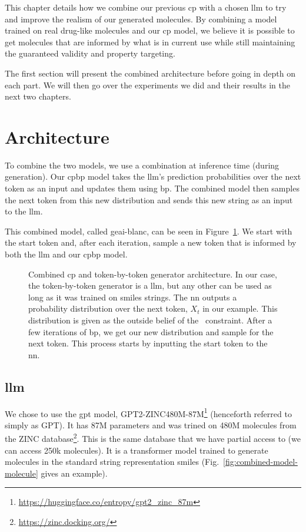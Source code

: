 \documentclass[../Document.tex]{subfiles}
\begin{document}
\label{chap:gpt+cp}
This chapter details how we combine our previous \gls{cp} with a chosen \gls{llm} to try and improve the realism of our generated molecules. By combining a model trained on real drug-like molecules and our \gls{cp} model, we believe it is possible to get molecules that are informed by what is in current use while still maintaining the guaranteed validity and property targeting.

The first section will present the combined architecture before going in depth on each part. We will then go over the experiments we did and their results in the next two chapters.

\section{Architecture}
To combine the two models, we use a combination at inference time (\ie during generation). Our \gls{cpbp} model takes the \gls{llm}'s prediction probabilities over the next token as an input and updates them using \gls{bp}. The combined model then samples the next token from this new distribution and sends this new string as an input to the \gls{llm}.

This combined model, called \gls{geai-blanc}, can be seen in Figure~\ref{fig:combined-architecture}. We start with the start token and, after each iteration, sample a new token that is informed by both the \gls{llm} and our \gls{cpbp} model.

\begin{figure}
    \centering
    
    \caption[Combined \gls{cp} and token-by-token generator architecture.]{Combined \gls{cp} and token-by-token generator architecture. In our case, the token-by-token generator is a \gls{llm}, but any other can be used as long as it was trained on \gls{smiles} strings. The \gls{nn} outputs a probability distribution over the next token, $X_t$ in our example. This distribution is given as the outside belief of the \oracle\ constraint. After a few iterations of \gls{bp}, we get our new distribution and sample for the next token. This process starts by inputting the start token to the \gls{nn}.}
    \label{fig:combined-architecture}
\end{figure}

\subsection{\gls{llm}}
We chose to use the \gls{gpt} model, GPT2-ZINC480M-87M\footnote{\url{https://huggingface.co/entropy/gpt2_zinc_87m}} (henceforth referred to simply as GPT).
It has 87M parameters and was trined on 480M molecules from the ZINC database\footnote{\url{https://zinc.docking.org/}}.
This is the same database that we have partial access to (we can access 250k molecules).
It is a transformer model trained to generate molecules in the standard string representation \gls{smiles} (Fig.~\ref{fig:combined-model-molecule} gives an example).
\end{document}
